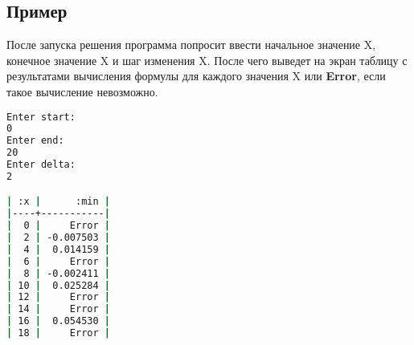 \documentclass[a4paper,12pt,russian]{report}
\begin{document}
\subsection{Пример}
После запуска решения программа попросит ввести начальное значение X, конечное значение X и шаг изменения X. После чего выведет на экран таблицу с результатами вычисления формулы для каждого значения X или \textbf{Error}, если такое вычисление невозможно.
\begin{lstlisting}[language=bash]
Enter start:
0
Enter end:
20
Enter delta:
2

| :x |      :min |
|----+-----------|
|  0 |     Error |
|  2 | -0.007503 |
|  4 |  0.014159 |
|  6 |     Error |
|  8 | -0.002411 |
| 10 |  0.025284 |
| 12 |     Error |
| 14 |     Error |
| 16 |  0.054530 |
| 18 |     Error |
\end{lstlisting}
\end{document}

